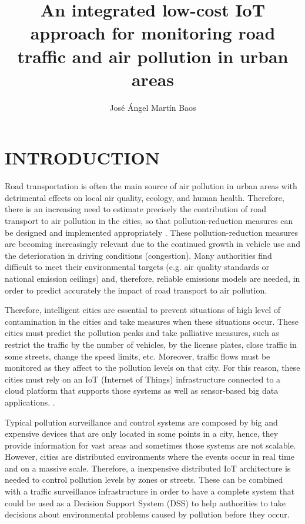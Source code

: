 \documentclass{pre-tfg}
\title{An integrated low-cost IoT approach for monitoring road traffic and air pollution in urban areas}
\author{José Ángel Martín Baos}
\begin{document}
\maketitle
\tableofcontents

\newpage


\section{INTRODUCTION}

Road transportation is often the main source of air pollution in urban areas with detrimental effects on local air quality, ecology, and human health. Therefore, there is an increasing need to estimate precisely the contribution of road transport to air pollution in the cities, so that pollution-reduction measures can be designed and implemented appropriately \cite{SNB10}. These pollution-reduction measures are becoming increasingly relevant due to the continued growth in vehicle use and the deterioration in driving conditions (congestion). Many authorities find difficult to meet their environmental targets (e.g. air quality standards or national emission ceilings) and, therefore, reliable emissions models are needed, in order to predict accurately the impact of road transport to air pollution.

Therefore, intelligent cities are essential to prevent situations of high level of contamination in the cities and take measures when these situations occur. These cities must predict the pollution peaks and take palliative measures, such as restrict the traffic by the number of vehicles, by the license plates, close traffic in some streets, change the speed limits, etc. Moreover, traffic flows must be monitored as they affect to the pollution levels on that city. For this reason, these cities must rely on an IoT (Internet of Things) infrastructure connected to a cloud platform that supports those systems as well as sensor-based big data applications. \cite{Bib18}.



Typical pollution surveillance and control systems are composed by big and expensive devices that are only located in some points in a city, hence, they provide information for vast areas and sometimes those systems are not scalable. However, cities are distributed environments where the events occur in real time and on a massive scale. Therefore, a inexpensive distributed IoT architecture is needed to control pollution levels by zones or streets. These can be combined with a traffic surveillance infrastructure in order to have a complete system that could be used as a Decision Support System (DSS) to help authorities to take decisions about environmental problems caused by pollution before they occur.
\end{document}
